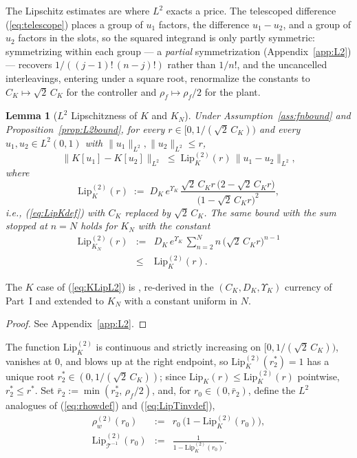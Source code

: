 \documentclass[10pt,a4paper]{amsart}
\newtheorem{lemma}{Lemma}
\newcommand{\Tcal}{\mathcal{T}}
\newcommand{\Ltwo}{L^2}
\newcommand{\Lipk}{\mathrm{Lip}_K}
\newcommand{\LipKn}{\mathrm{Lip}_{K_N}}
\newcommand{\LipT}{\mathrm{Lip}_{\Tcal^{-1}}}
\begin{document}
The Lipschitz estimates are where $\Ltwo$ exacts a price. The telescoped difference (\ref{eq:telescope}) places a group of $u_1$ factors, the difference $u_1 - u_2$, and a group of $u_2$ factors in the slots, so the squared integrand is only partly symmetric: symmetrizing within each group --- a \emph{partial} symmetrization (Appendix~\ref{app:L2}) --- recovers $1/((j-1)!\,(n-j)!)$ rather than $1/n!$, and the uncancelled interleavings, entering under a square root, renormalize the constants to $C_K \mapsto \sqrt{2}\,C_K$ for the controller and $\rho_f \mapsto \rho_f/2$ for the plant.

\begin{lemma}[$\Ltwo$ Lipschitzness of $K$ and $K_N$]\label{lem:KLipL2}
Under Assumption~\ref{ass:fnbound} and Proposition~\ref{prop:L2bound}, for every $r \in [0, 1/(\sqrt{2}\,C_K))$ and every $u_1, u_2 \in \Ltwo(0,1)$ with $\|u_1\|_{\Ltwo}, \|u_2\|_{\Ltwo} \le r$,
\begin{equation}
\bigl\|K[u_1] - K[u_2]\bigr\|_{\Ltwo} \;\le\; \Lipk^{(2)}(r)\,\|u_1 - u_2\|_{\Ltwo},
\label{eq:KLipL2}
\end{equation}
where
\begin{equation}
\Lipk^{(2)}(r) \;:=\; D_K\, e^{\Upsilon_K}\, \frac{\sqrt{2}\,C_K r\,\bigl(2 - \sqrt{2}\,C_K r\bigr)}{\bigl(1 - \sqrt{2}\,C_K r\bigr)^2},
\label{eq:LipK2def}
\end{equation}
i.e., (\ref{eq:LipKdef}) with $C_K$ replaced by $\sqrt{2}\,C_K$. The same bound with the sum stopped at $n = N$ holds for $K_N$ with the constant
\begin{eqnarray}
\LipKn^{(2)}(r) &:=& D_K\, e^{\Upsilon_K}\, \sum_{n=2}^N n\,\bigl(\sqrt{2}\,C_K r\bigr)^{n-1} \nonumber \\
&\le& \Lipk^{(2)}(r).
\label{eq:LipKN2def}
\end{eqnarray}
\end{lemma}

The $K$ case of (\ref{eq:KLipL2}) is \cite[Lemma~2]{krstic2026feedbacklinearizationhyperbolicpdes}, re-derived in the $(C_K, D_K, \Upsilon_K)$ currency of Part~I and extended to $K_N$ with a constant uniform in $N$.

\begin{proof} See Appendix~\ref{app:L2}. \end{proof}

The function $\Lipk^{(2)}$ is continuous and strictly increasing on $[0, 1/(\sqrt{2}\,C_K))$, vanishes at $0$, and blows up at the right endpoint, so $\Lipk^{(2)}(r_2^*) = 1$ has a unique root $r_2^* \in (0, 1/(\sqrt{2}\,C_K))$; since $\Lipk(r) \le \Lipk^{(2)}(r)$ pointwise, $r_2^* \le r^*$. Set $\bar r_2 := \min(r_2^*,\, \rho_f/2)$, and, for $r_0 \in (0, \bar r_2)$, define the $\Ltwo$ analogues of (\ref{eq:rhowdef}) and (\ref{eq:LipTinvdef}),
\begin{eqnarray}
\rho_w^{(2)}(r_0) &:=& r_0\,\bigl(1 - \Lipk^{(2)}(r_0)\bigr), \label{eq:rhow2def}\\
\LipT^{(2)}(r_0) &:=& \frac{1}{1 - \Lipk^{(2)}(r_0)}. \label{eq:LipT2def}
\end{eqnarray}
\end{document}
